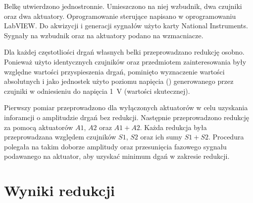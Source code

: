 \documentclass[polish,a4paper,11pt]{mwart}
\let\Oldsection\section
\renewcommand{\section}{\FloatBarrier\Oldsection}
\begin{document}
  Belkę utwierdzono jednostronnie. Umieszczono na niej wzbudnik, dwa czujniki
  oraz dwa aktuatory. Oprogramowanie sterujące napisano w oprogramowaniu
  LabVIEW\textregistered. Do akwizycji i generacji sygnałów użyto karty
  National Instruments\textregistered. Sygnały na wzbudnik oraz na aktuatory
  podano na wzmacniacze. 

  Dla każdej częstotliości drgań własnych belki przeprowadzano redukcję osobno.
  Ponieważ użyto identycznych czujników oraz przedmiotem zainteresowania były
  względne wartości przyspieszenia drgań, pominięto wyznaczenie wartości
  absolutnych i jako jednostek użyto poziomu napięcia (\si{\decibelV})
  generowanego przez czujniki w odniesieniu do napięcia \SI{1}{\volt} (wartości
  skutecznej). 

  Pierwszy pomiar przeprowadzono dla wyłączonych aktuatorów w celu uzyskania
  inforamcji o amplitudzie drgań bez redukcji. Następnie przeprowadzono
  redukcję za pomocą aktuatorów $A1$, $A2$ oraz $A1+A2$. Każda redukcja była
  przeprowadzana względem czujników $S1$, $S2$ oraz ich sumy $S1+S2$.
  Procedura polegała na takim doborze amplitudy oraz
  przesunięcia fazowego sygnału podawanego na aktuator, aby uzyskać minimum
  dgań w zakresie redukcji.

  \section{Wyniki redukcji}
  
\end{document}
